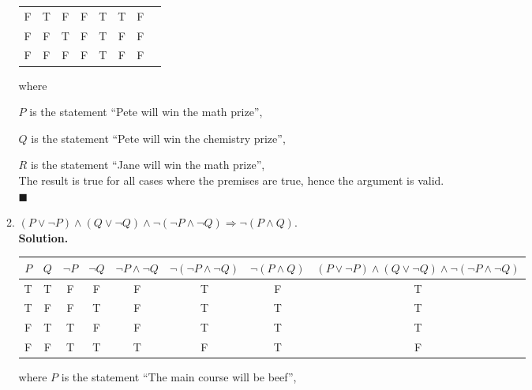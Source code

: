 \documentclass{report}
\newcommand{\sol}{\vspace{1em}\\\textbf{Solution.}\vspace{0.5em}}
\newcommand{\qed}{‎\\‎\hfill$\blacksquare$\vspace{1em}}
\begin{document}
\begin{enumerate}[leftmargin=*]
\begin{enumerate}
\begin{center}
\begin{tabular}{cccccccc}
                            F   & T   & F   & F            & T                  & T          & F                                             \\
                            F   & F   & T   & F            & T                  & F          & F                                             \\
                            F   & F   & F   & F            & T                  & F          & F
                        \end{tabular}
                    \end{center}
                    where

                    $P$ is the statement ``Pete will win the math prize'',

                    $Q$ is the statement ``Pete will win the chemistry prize'',

                    $R$ is the statement ``Jane will win the math prize'',\\

                    The result is true for all cases where the premises are true, hence the
                    argument is valid.\qed

              \item $(P \vee \neg P) \wedge (Q \vee \neg Q)
                        \wedge \neg(\neg P \wedge \neg Q) \Rightarrow \neg(P \wedge Q)$.
                    \sol{}
                    \begin{center}
                        \begin{tabular}{cccccccc}
                            $P$ & $Q$ & $\neg P$ & $\neg Q$ & $\neg P \wedge \neg Q$ & $\neg(\neg P \wedge \neg Q)$ & $\neg(P \wedge Q)$ & $(P \vee \neg P) \wedge (Q \vee \neg Q) \wedge \neg(\neg P \wedge \neg Q)$ \\
                            \hline
                            T   & T   & F        & F        & F                      & T                            & F                  & T                                                                          \\
                            T   & F   & F        & T        & F                      & T                            & T                  & T                                                                          \\
                            F   & T   & T        & F        & F                      & T                            & T                  & T                                                                          \\
                            F   & F   & T        & T        & T                      & F                            & T                  & F
                        \end{tabular}
                    \end{center}
                    where $P$ is the statement ``The main course will be beef'',


\end{enumerate}
\end{enumerate}
\end{document}
